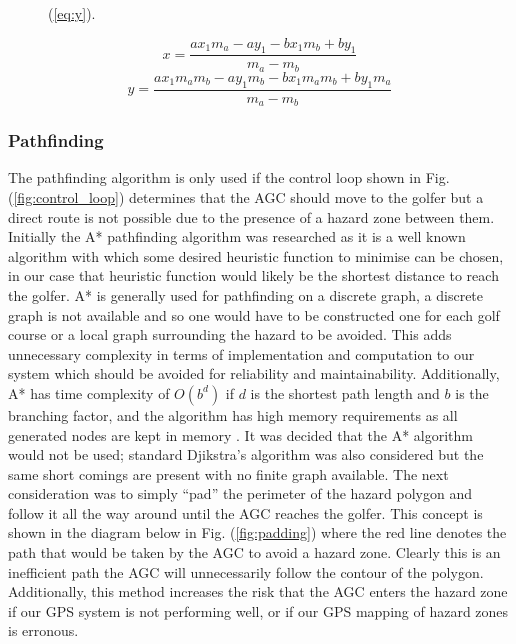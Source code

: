 \documentclass[11pt,landscape]{article}
\begin{document}
\begin{multicols}{3}
\begin{figure}[H]
\begin{mdframed}
    (\ref{eq:y}).
    \begin{center}
        \begin{equation}
            x = \frac{ax_{1} m_{a} - ay_{1} - bx_{1} m_{b} + by_{1}}{m_{a} - m_{b}}
            \label{eq:x}
        \end{equation}
        \begin{equation}
            y = \frac{ax_{1} m_{a} m_{b} - ay_{1} m_{b} - bx_{1} m_{a} m_{b} + by_{1} m_{a}}{m_{a} - m_{b}}
            \label{eq:y}
        \end{equation}
    \end{center}
    \end{mdframed}
    \label{fig:segment_calculations}
\end{figure}

\subsubsection{Pathfinding}
The pathfinding algorithm is only used if the control loop shown in Fig.
(\ref{fig:control_loop}) determines that the AGC should move to the golfer but a
direct route is not possible due to the presence of a hazard zone between them.
Initially the A* pathfinding algorithm was researched as it is a well known
algorithm with which some desired heuristic function to minimise can be chosen,
in our case that heuristic function would likely be the shortest distance to
reach the golfer. A* is generally used for pathfinding on a discrete graph, a
discrete graph is not available and so one would have to be constructed one for
each golf course or a local graph surrounding the hazard to be avoided. This
adds unnecessary complexity in terms of implementation and computation to our
system which should be avoided for reliability and maintainability.
Additionally, A* has time complexity of $O(b^d)$ if $d$ is the shortest path
length and $b$ is the branching factor, and the algorithm has high memory
requirements as all generated nodes are kept in memory \cite{astar_2009}. It was
decided that the A* algorithm would not be used; standard Djikstra's algorithm was also
considered but the same short comings are present with no finite
graph available. The next consideration was to simply ``pad'' the perimeter of the hazard
polygon and follow it all the way around until the AGC reaches the golfer. This
concept is shown in the diagram below in Fig. (\ref{fig:padding}) where the red
line denotes the path that would be taken by the AGC to avoid a hazard zone.
Clearly this is an inefficient path the AGC will unnecessarily follow the
contour of the polygon. Additionally, this method increases the risk that the
AGC enters the hazard zone if our GPS system is not performing well, or if our
GPS mapping of hazard zones is erronous.  



\end{multicols}
\end{document}
